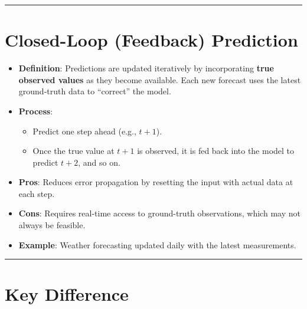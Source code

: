 \begin{notechapter}
\begin{center}\rule{0.5\linewidth}{0.5pt}\end{center}

\section{Closed-Loop (Feedback) Prediction}

\begin{itemize}
\tightlist
\item
  \textbf{Definition}: Predictions are updated iteratively by
  incorporating \textbf{true observed values} as they become available.
  Each new forecast uses the latest ground-truth data to ``correct'' the
  model.
\item
  \textbf{Process}:

  \begin{itemize}
  \tightlist
  \item
    Predict one step ahead (e.g., \(t+1\)).
  \item
    Once the true value at \(t+1\) is observed, it is fed back into the
    model to predict \(t+2\), and so on.
  \end{itemize}
\item
  \textbf{Pros}: Reduces error propagation by resetting the input with
  actual data at each step.
\item
  \textbf{Cons}: Requires real-time access to ground-truth observations,
  which may not always be feasible.
\item
  \textbf{Example}: Weather forecasting updated daily with the latest
  measurements.
\end{itemize}

\begin{center}\rule{0.5\linewidth}{0.5pt}\end{center}

\section{Key Difference}


\end{notechapter}
